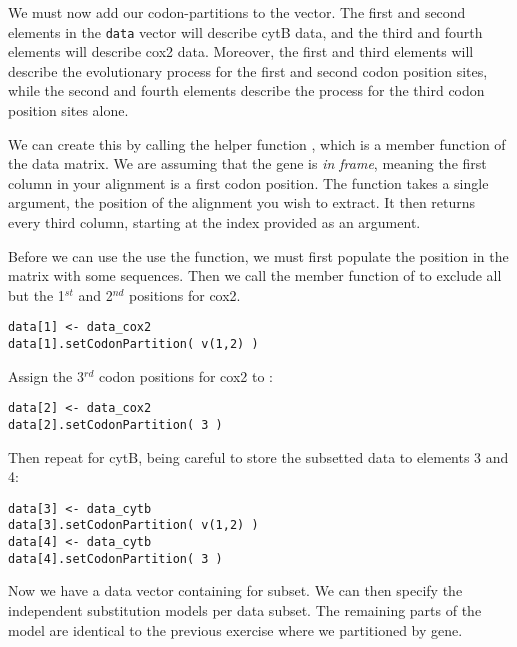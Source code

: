 We must now add our codon-partitions to the  vector.
The first and second elements in the {\tt data} vector will describe cytB data, and the third and fourth elements will describe cox2 data.
Moreover, the first and third elements will describe the evolutionary process for the first and second codon position sites, while the second and fourth elements describe the process for the third codon position sites alone.

We can create this by calling the helper function , which is a member function of the data matrix. 
We are assuming that the gene is \textit{in frame}, meaning the first column in your alignment is a first codon position. 
The  function takes a single argument, the position of the alignment you wish to extract. 
It then returns every third column, starting at the index provided as an argument.

Before we can use the use the  function, we must first populate the position in the  matrix with some sequences. 
Then we call the member function of  to exclude all but the 1$^{st}$ and 2$^{nd}$ positions for cox2.
{\tt \begin{snugshade*}
\begin{lstlisting}
data[1] <- data_cox2
data[1].setCodonPartition( v(1,2) )
\end{lstlisting}
\end{snugshade*}}

Assign the 3$^{rd}$ codon positions for cox2 to :
{\tt \begin{snugshade*}
\begin{lstlisting}
data[2] <- data_cox2
data[2].setCodonPartition( 3 )
\end{lstlisting}
\end{snugshade*}}

Then repeat for cytB, being careful to store the subsetted data to elements 3 and 4:
{\tt \begin{snugshade*}
\begin{lstlisting}
data[3] <- data_cytb
data[3].setCodonPartition( v(1,2) )
data[4] <- data_cytb
data[4].setCodonPartition( 3 )
\end{lstlisting}
\end{snugshade*}}

Now we have a data vector containing for subset.
We can then specify the independent substitution models per data subset.
The remaining parts of the model are identical to the previous exercise where we partitioned by gene.

